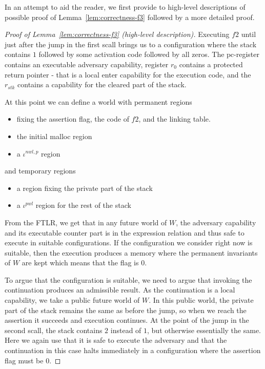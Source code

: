 \documentclass[a4paper]{article}
\newcommand{\var}[1]{\mathit{#1}}
\newcommand{\pcreg}{\mathrm{pc}}
\newcommand{\stk}{\var{stk}}
\newcommand{\nwl}{\var{nwl}}
\newcommand{\pwl}{\var{pwl}}
\newcommand{\plainperm}[1]{\mathrm{#1}}
\newcommand{\local}{\plainperm{local}}
\begin{document}
In an attempt to aid the reader, we first provide to high-level descriptions of possible proof of Lemma~\ref{lem:correctness-f3} followed by a more detailed proof.
\begin{proof}[Proof of Lemma~\ref{lem:correctness-f3} (high-level description)]
Executing $f2$ until just after the jump in the first scall brings us to a configuration where the stack contains $1$ followed by some activation code followed by all zeros. The $\pcreg$-register contains an executable adversary capability, register $r_0$ contains a protected return pointer - that is a local enter capability for the execution code, and the $r_\stk$ contains a capability for the cleared part of the stack.

At this point we can define a world with permanent regions
\begin{itemize}
\item fixing the assertion flag, the code of $f2$, and the linking table.
\item the initial malloc region
\item a $\iota^{\nwl,p}$ region
\end{itemize}
and temporary regions
\begin{itemize}
\item a region fixing the private part of the stack
\item a $\iota^\pwl$ region for the rest of the stack 
\end{itemize}
From the FTLR, we get that in any future world of $W$, the adversary capability and its executable counter part is in the expression relation and thus safe to execute in suitable configurations. If the configuration we consider right now is suitable, then the execution produces a memory where the permanent invariants of $W$ are kept which means that the flag is $0$.

To argue that the configuration is suitable, we need to argue that invoking the continuation produces an admissible result. As the continuation is a $\local$ capability, we take a public future world of $W$. In this public world, the private part of the stack remains the same as before the jump, so when we reach the assertion it succeeds and execution continues. At the point of the jump in the second scall, the stack contains $2$ instead of $1$, but otherwise essentially the same. Here we again use that it is safe to execute the adversary and that the continuation in this case halts immediately in a configuration where the assertion flag must be $0$.
\end{proof}
\end{document}
